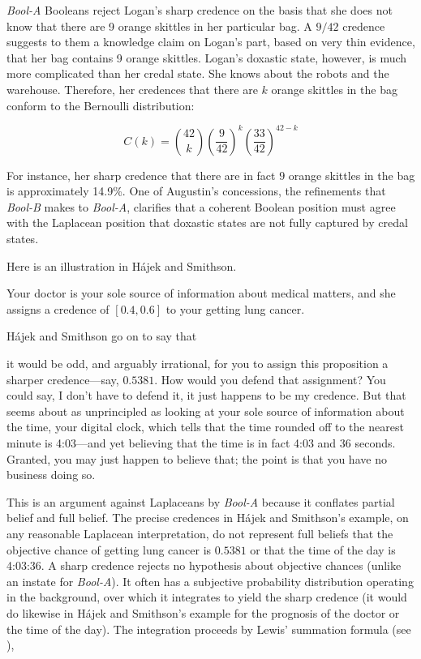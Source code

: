 \documentclass[11pt]{article}
\newcommand{\anderson}[0]{\textit{Bool-A}}
\newcommand{\augustin}[0]{\textit{Bool-B}}
\begin{document}
{\anderson} Booleans reject Logan's sharp credence on the basis
that she does not know that there are 9 orange skittles in her
particular bag. A $9/42$ credence suggests to them a knowledge claim
on Logan's part, based on very thin evidence, that her bag contains 9
orange skittles. Logan's doxastic state, however, is much more
complicated than her credal state. She knows about the robots and the
warehouse. Therefore, her credences that there are $k$ orange skittles
in the bag conform to the Bernoulli distribution:

\begin{equation}
  \label{eq:bern}
  C(k)=\binom{42}{k}\left(\frac{9}{42}\right)^{k}\left(\frac{33}{42}\right)^{42-k}
\end{equation}

For instance, her sharp credence that there are in fact $9$ orange
skittles in the bag is approximately 14.9\%. One of Augustin's
concessions, the refinements that {\augustin} makes to {\anderson},
clarifies that a coherent Boolean position must agree with the
Laplacean position that doxastic states are not fully captured by
credal states.

Here is an illustration in H{\'a}jek and Smithson.

\begin{quotex}
  \label{ex:crude} Your doctor is your
  sole source of information about medical matters, and she assigns a
  credence of $[0.4,0.6]$ to your getting lung cancer.
\end{quotex}

H{\'a}jek and Smithson go on to say that 

\begin{quotex}
  it would be odd, and arguably irrational, for you to assign this
  proposition a sharper credence---say, $0.5381$. How would you defend
  that assignment? You could say, I don't have to defend it, it just
  happens to be my credence. But that seems about as unprincipled as
  looking at your sole source of information about the time, your
  digital clock, which tells that the time rounded off to the nearest
  minute is 4:03---and yet believing that the time is in fact 4:03 and
  36 seconds. Granted, you may just happen to believe that; the point
  is that you have no business doing so.
\end{quotex}

This is an argument against Laplaceans by {\anderson} because it
conflates partial belief and full belief. The precise credences in
H{\'a}jek and Smithson's example, on any reasonable Laplacean
interpretation, do not represent full beliefs that the objective
chance of getting lung cancer is $0.5381$ or that the time of the day
is 4:03:36. A sharp credence rejects no hypothesis about objective
chances (unlike an instate for {\anderson}). It often has a subjective
probability distribution operating in the background, over which it
integrates to yield the sharp credence (it would do likewise in
H{\'a}jek and Smithson's example for the prognosis of the doctor or
the time of the day). The integration proceeds by Lewis'
summation formula (see ),
\end{document}
